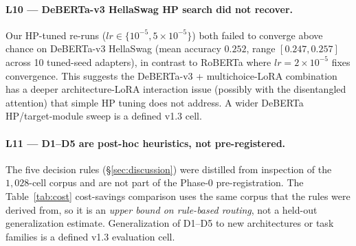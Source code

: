 \documentclass[11pt]{article}
\begin{document}
\paragraph{L10 — DeBERTa-v3 HellaSwag HP search did not recover.} Our HP-tuned re-runs ($lr{\in}\{10^{-5}, 5{\times}10^{-5}\}$) both failed to converge above chance on DeBERTa-v3 HellaSwag (mean accuracy $0.252$, range $[0.247, 0.257]$ across 10 tuned-seed adapters), in contrast to RoBERTa where $lr{=}2{\times}10^{-5}$ fixes convergence. This suggests the DeBERTa-v3 + multichoice-LoRA combination has a deeper architecture-LoRA interaction issue (possibly with the disentangled attention) that simple HP tuning does not address. A wider DeBERTa HP/target-module sweep is a defined v1.3 cell.

\paragraph{L11 — D1--D5 are post-hoc heuristics, not pre-registered.} The five decision rules (\S\ref{sec:discussion}) were distilled from inspection of the $1{,}028$-cell corpus and are not part of the Phase-0 pre-registration. The Table~\ref{tab:cost} cost-savings comparison uses the same corpus that the rules were derived from, so it is an \emph{upper bound on rule-based routing}, not a held-out generalization estimate. Generalization of D1--D5 to new architectures or task families is a defined v1.3 evaluation cell.
\end{document}
